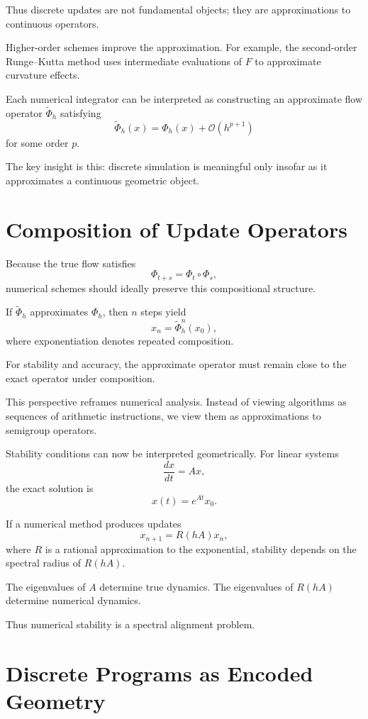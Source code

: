 \documentclass[12pt]{book}
\begin{document}
Thus discrete updates are not fundamental objects; they are approximations to continuous operators.

Higher-order schemes improve the approximation. For example, the second-order Runge--Kutta method uses intermediate evaluations of $F$ to approximate curvature effects.

Each numerical integrator can be interpreted as constructing an approximate flow operator $\tilde{\Phi}_h$ satisfying
\[
\tilde{\Phi}_h(x) = \Phi_h(x) + \mathcal{O}(h^{p+1})
\]
for some order $p$.

The key insight is this: discrete simulation is meaningful only insofar as it approximates a continuous geometric object.

\section{Composition of Update Operators}

Because the true flow satisfies
\[
\Phi_{t+s} = \Phi_t \circ \Phi_s,
\]
numerical schemes should ideally preserve this compositional structure.

If $\tilde{\Phi}_h$ approximates $\Phi_h$, then $n$ steps yield
\[
x_n = \tilde{\Phi}_h^n(x_0),
\]
where exponentiation denotes repeated composition.

For stability and accuracy, the approximate operator must remain close to the exact operator under composition.

This perspective reframes numerical analysis. Instead of viewing algorithms as sequences of arithmetic instructions, we view them as approximations to semigroup operators.

Stability conditions can now be interpreted geometrically. For linear systems
\[
\frac{dx}{dt} = Ax,
\]
the exact solution is
\[
x(t) = e^{At} x_0.
\]

If a numerical method produces updates
\[
x_{n+1} = R(hA) x_n,
\]
where $R$ is a rational approximation to the exponential, stability depends on the spectral radius of $R(hA)$.

The eigenvalues of $A$ determine true dynamics. The eigenvalues of $R(hA)$ determine numerical dynamics.

Thus numerical stability is a spectral alignment problem.

\section{Discrete Programs as Encoded Geometry}
\end{document}
